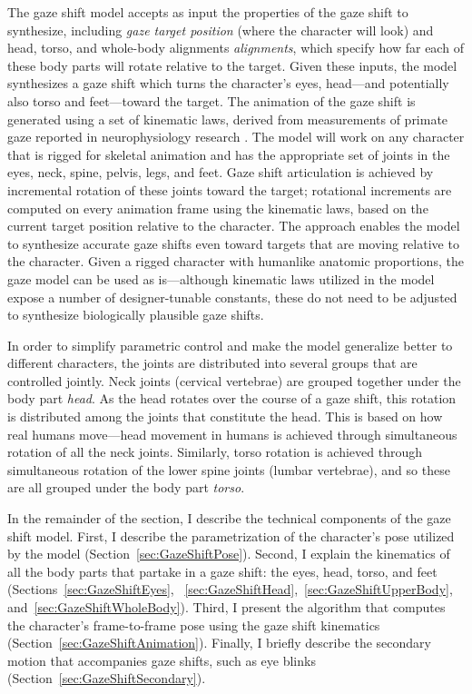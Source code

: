 The gaze shift model accepts as input the properties of the gaze shift to synthesize, including \emph{gaze target position} (where the character will look) and head, torso, and whole-body alignments \emph{alignments}, which specify how far each of these body parts will rotate relative to the target. Given these inputs, the model synthesizes a gaze shift which turns the character's eyes, head---and potentially also torso and feet---toward the target. The animation of the gaze shift is generated using a set of kinematic laws, derived from measurements of primate gaze reported in neurophysiology research \cite{baloh1975quantitative,guitton1987gaze,freedman2000coordination,hollands2004wholebody,mccluskey2007monkeys}.
The model will work on any character that is rigged for skeletal animation and has the appropriate set of joints in the eyes, neck, spine, pelvis, legs, and feet. Gaze shift articulation is achieved by incremental rotation of these joints toward the target; rotational increments are computed on every animation frame using the kinematic laws, based on the current target position relative to the character. The approach enables the model to synthesize accurate gaze shifts even toward targets that are moving relative to the character. Given a rigged character with humanlike anatomic proportions, the gaze model can be used as is---although kinematic laws utilized in the model expose a number of designer-tunable constants, these do not need to be adjusted to synthesize biologically plausible gaze shifts.

In order to simplify parametric control and make the model generalize better to different characters, the joints are distributed into several groups that are controlled jointly. Neck joints (cervical vertebrae) are grouped together under the body part \emph{head}. As the head rotates over the course of a gaze shift, this rotation is distributed among the joints that constitute the head. This is based on how real humans move---head movement in humans is achieved through simultaneous rotation of all the neck joints. Similarly, torso rotation is achieved through simultaneous rotation of the lower spine joints (lumbar vertebrae), and so these are all grouped under the body part \emph{torso}.

In the remainder of the section, I describe the technical components of the gaze shift model. First, I describe the parametrization of the character's pose utilized by the model (Section~\ref{sec:GazeShiftPose}). Second, I explain the kinematics of all the body parts that partake in a gaze shift: the eyes, head, torso, and feet (Sections~\ref{sec:GazeShiftEyes}, ~\ref{sec:GazeShiftHead},~\ref{sec:GazeShiftUpperBody}, and~\ref{sec:GazeShiftWholeBody}). Third, I present the algorithm that computes the character's frame-to-frame pose using the gaze shift kinematics (Section~\ref{sec:GazeShiftAnimation}). Finally, I briefly describe the secondary motion that accompanies gaze shifts, such as eye blinks (Section~\ref{sec:GazeShiftSecondary}).

